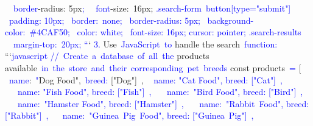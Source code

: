 \documentclass{article}
\begin{document}
\begin{tcolorbox}[colframe=black,colback=white]
{\textcolor{blue}{~}\textcolor{blue}{~border}-radius: 5px\textcolor{blue}{;
}\textcolor{blue}{~}\textcolor{blue}{~font}-size:\textcolor{blue}{~}16px;
}
\textcolor{blue}{.search}\textcolor{blue}{-form}\textcolor{blue}{~button}\textcolor{blue}{[type}\textcolor{blue}{="}\textcolor{blue}{submit}\textcolor{blue}{"]}\textcolor{blue}{~{
} \textcolor{blue}{~padding}\textcolor{blue}{:} \textcolor{blue}{10}px\textcolor{blue}{;
} \textcolor{blue}{~border}:\textcolor{blue}{~none};
 \textcolor{blue}{~border}\textcolor{blue}{-radius}: \textcolor{blue}{5}px\textcolor{blue}{;
} \textcolor{blue}{~background}-color\textcolor{blue}{:}\textcolor{blue}{~\#}4CAF50\textcolor{blue}{;
} \textcolor{blue}{~color}\textcolor{blue}{:} white;
 \textcolor{blue}{~font}\textcolor{blue}{-size}: \textcolor{blue}{16}px\textcolor{blue}{;
}  cursor\textcolor{blue}{:} pointer\textcolor{blue}{;
}\textcolor{blue}{}
}\textcolor{blue}{.search}\textcolor{blue}{-results}\textcolor{blue}{~{
}\textcolor{blue}{~}\textcolor{blue}{~margin}\textcolor{blue}{-top}:\textcolor{blue}{~}\textcolor{blue}{20}px\textcolor{blue}{;
}}
\textcolor{blue}{``}`
\textcolor{blue}{3}\textcolor{blue}{.} Use\textcolor{blue}{~JavaScript}\textcolor{blue}{~to} handle the search\textcolor{blue}{~function}\textcolor{blue}{:
}```\textcolor{blue}{javascript}\textcolor{blue}{
}\textcolor{blue}{//}\textcolor{blue}{~Create}\textcolor{blue}{~a}\textcolor{blue}{~database}\textcolor{blue}{~of}\textcolor{blue}{~all}\textcolor{blue}{~the} products available\textcolor{blue}{~in}\textcolor{blue}{~the}\textcolor{blue}{~store}\textcolor{blue}{~and}\textcolor{blue}{~their}\textcolor{blue}{~corresponding}\textcolor{blue}{~pet}\textcolor{blue}{~breeds}\textcolor{blue}{
}const products\textcolor{blue}{~=} [
\textcolor{blue}{~} {\textcolor{blue}{~name}:\textcolor{blue}{~"}Dog Food",\textcolor{blue}{~breed}\textcolor{blue}{:} ["Dog"]\textcolor{blue}{~},
} \textcolor{blue}{~{} name: "Cat Food", breed: ["\textcolor{blue}{Cat}"]\textcolor{blue}{~},
}\textcolor{blue}{~}\textcolor{blue}{~{}\textcolor{blue}{~name}: "Fish Food", breed: ["Fish"]\textcolor{blue}{~},
}\textcolor{blue}{~}\textcolor{blue}{~{}\textcolor{blue}{~name}:\textcolor{blue}{~"}Bird Food", breed: ["Bird"]\textcolor{blue}{~},
}\textcolor{blue}{~}\textcolor{blue}{~{}\textcolor{blue}{~name}:\textcolor{blue}{~"}Hamster Food", breed: ["\textcolor{blue}{Ham}\textcolor{blue}{ster}"]\textcolor{blue}{~},
}\textcolor{blue}{~}\textcolor{blue}{~{}\textcolor{blue}{~name}:\textcolor{blue}{~"}R\textcolor{blue}{abbit}\textcolor{blue}{~Food}", breed: ["R\textcolor{blue}{abbit}"]\textcolor{blue}{~},
}\textcolor{blue}{~}\textcolor{blue}{~{} name:\textcolor{blue}{~"}Guinea\textcolor{blue}{~Pig}\textcolor{blue}{~Food}\textcolor{blue}{",} breed: ["\textcolor{blue}{Gu}inea\textcolor{blue}{~Pig}\textcolor{blue}{"]}\textcolor{blue}{~},
}
\end{tcolorbox}
\end{document}
